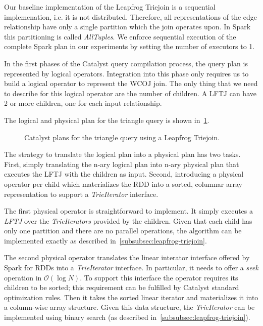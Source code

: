 Our baseline implementation of the Leapfrog Triejoin is a sequential implemenation, i.e. it is not distributed.
Therefore, all representations of the edge relationship have only a single partition which the join operates upon.
In Spark this partitioning is called \textit{AllTuples}.
We enforce sequential execution of the complete Spark plan in our experiments by setting the number of executors to 1.

In the first phases of the Catalyst query compilation process, the query plan is represented by logical operators.
Integration into this phase only requires us to build a logical operator to represent the \textsc{WCOJ} join.
The only thing that we need to describe for this logical operator are the number of children.
A \textsc{LFTJ} can have 2 or more children, one for each input relationship.

The logical and physical plan for the triangle query is shown in~\cref{fig:lftj-catalyst-plan}.

\begin{figure}
    \caption{Catalyst plans for the triangle query using a Leapfrog Triejoin.}
    \label{fig:lftj-catalyst-plan}
\end{figure}

The strategy to translate the logical plan into a physical plan has two tasks.
First, simply translating the n-ary logical plan into n-ary physical plan that executes the \textsc{LFTJ} with the children as input.
Second, introducing a physical operator per child which materializes the RDD into a sorted, columnar array representation to support a
\textit{TrieIterator} interface.

The first physical operator is straightforward to implement.
It simply executes a \textit{LFTJ} over the \textit{TrieIterators} provided by the children.
Given that each child has only one partition and there are no parallel operations, the algorithm can be implemented exactly
as described in~\cref{subsubsec:leapfrog-triejoin}.

The second physical operator translates the linear interator interface offered by Spark for RDDs into a \textit{TrieIterator} interface.
In particular, it needs to offer a \textit{seek} operation in $\mathcal{O} (\log N) $.
To support this interface the operator requires its children to be sorted;
this requirement can be fulfilled by Catalyst standard optimization rules.
Then it takes the sorted linear iterator and materializes it into a column-wise array structure.
Given this data structure, the \textit{TrieIterator} can be implemented using binary search (as described
in~\cref{subsubsec:leapfrog-triejoin}).

